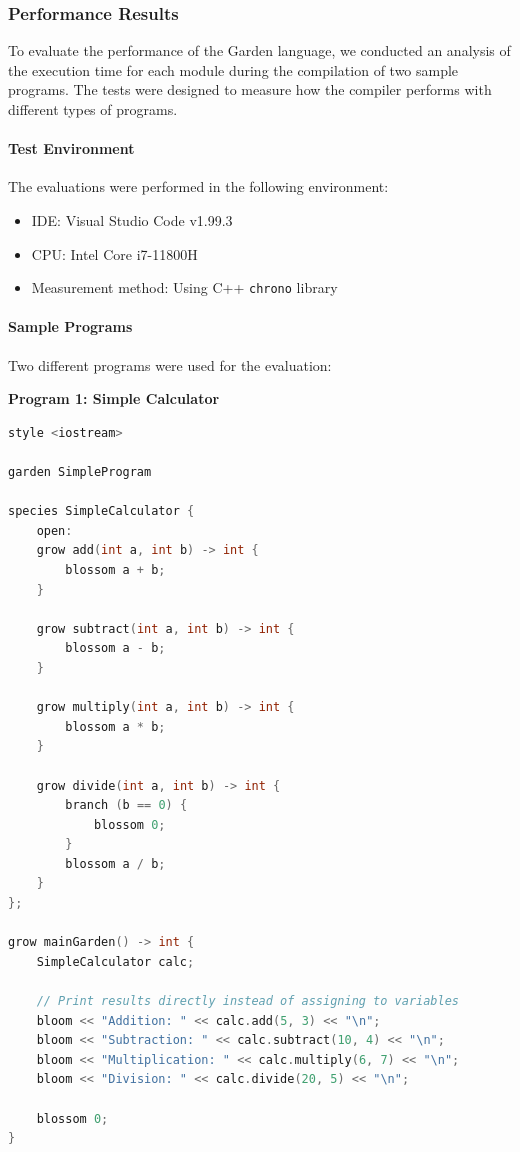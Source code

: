 \documentclass[conference]{IEEEtran}
\begin{document}
\subsubsection{Performance Results}

To evaluate the performance of the Garden language, we conducted an analysis of the execution time for each module during the compilation of two sample programs. The tests were designed to measure how the compiler performs with different types of programs.

\paragraph{Test Environment}
The evaluations were performed in the following environment:
\begin{itemize}
	\item IDE: Visual Studio Code v1.99.3
	\item CPU: Intel Core i7-11800H
	\item Measurement method: Using C++ \texttt{chrono} library
\end{itemize}

\paragraph{Sample Programs}
Two different programs were used for the evaluation:

\textbf{Program 1: Simple Calculator}
\begin{lstlisting}[language=C++, caption={Sample Program 1: Simple Calculator (Hanami-like syntax)}, label={lst:perf_prog1}, basicstyle=\ttfamily\scriptsize, columns=flexible]
style <iostream>

garden SimpleProgram

species SimpleCalculator {
    open:
    grow add(int a, int b) -> int {
        blossom a + b;
    }
    
    grow subtract(int a, int b) -> int {
        blossom a - b;
    }
    
    grow multiply(int a, int b) -> int {
        blossom a * b;
    }
    
    grow divide(int a, int b) -> int {
        branch (b == 0) {
            blossom 0;
        }
        blossom a / b;
    }
};

grow mainGarden() -> int {
    SimpleCalculator calc;
    
    // Print results directly instead of assigning to variables
    bloom << "Addition: " << calc.add(5, 3) << "\n";
    bloom << "Subtraction: " << calc.subtract(10, 4) << "\n";
    bloom << "Multiplication: " << calc.multiply(6, 7) << "\n";
    bloom << "Division: " << calc.divide(20, 5) << "\n";
    
    blossom 0;
}
\end{lstlisting}
\end{document}
